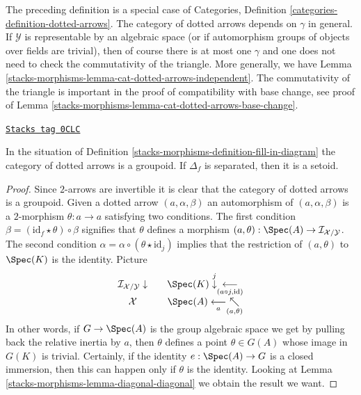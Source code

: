 The preceding definition is a special case of Categories,
Definition \ref{categories-definition-dotted-arrows}.
The category of dotted arrows depends on $\gamma$ in general.
If $\mathcal{Y}$ is representable by an algebraic space
(or if automorphism groups of objects over fields are trivial), then
of course there is at most one $\gamma$ and one does not need
to check the commutativity of the triangle. More generally, we
have Lemma \ref{stacks-morphisms-lemma-cat-dotted-arrows-independent}.
The commutativity of the triangle is important in the proof
of compatibility with base change, see
proof of Lemma \ref{stacks-morphisms-lemma-cat-dotted-arrows-base-change}.

\begin{lemma}
\label{stacks-morphisms-lemma-cat-dotted-arrows}
\href{https://stacks.math.columbia.edu/tag/0CLC}{\texttt{Stacks tag 0CLC}}

In the situation of Definition \ref{stacks-morphisms-definition-fill-in-diagram}
the category of dotted arrows is a groupoid. If $\Delta_f$
is separated, then it is a setoid.
\end{lemma}

\begin{proof}
Since $2$-arrows are invertible it is clear that the category of
dotted arrows is a groupoid. Given a dotted arrow $(a, \alpha, \beta)$
an automorphism of $(a, \alpha, \beta)$ is a $2$-morphism
$\theta : a \to a$ satisfying two conditions. The first condition
$\beta = (\text{id}_f \star \theta) \circ \beta$ signifies that
$\theta$ defines a morphism
$(a, \theta) : \Spec(A) \to \mathcal{I}_{\mathcal{X}/\mathcal{Y}}$.
The second condition
$\alpha = \alpha \circ (\theta \star \text{id}_j)$
implies that the restriction of $(a, \theta)$ to $\Spec(K)$
is the identity. Picture
$$
\begin{array}{ccc}\mathcal{I}_{\mathcal{X}/\mathcal{Y}} \downarrow &  & \Spec(K) \overset{j}{\downarrow}\underset{(a \circ j, \text{id})}{\longleftarrow} \\ \mathcal{X} &  & \Spec(A) \underset{a}{\longleftarrow}\underset{(a, \theta)}{\nwarrow}\end{array}
$$
In other words, if $G \to \Spec(A)$ is the group algebraic space
we get by pulling back the relative inertia by $a$, then
$\theta$ defines a point $\theta \in G(A)$ whose image
in $G(K)$ is trivial. Certainly, if the identity $e : \Spec(A) \to G$
is a closed immersion, then this can happen only if
$\theta$ is the identity.
Looking at Lemma \ref{stacks-morphisms-lemma-diagonal-diagonal}
we obtain the result we want.
\end{proof}

